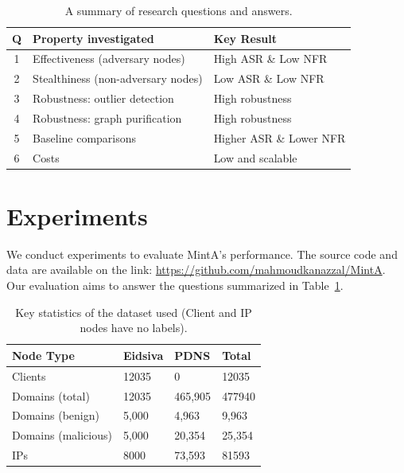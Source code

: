 \documentclass[conference,compsoc]{IEEEtran}
\begin{document}
\begin{table}[htb]
\centering
\caption{A summary of research questions and answers.}
\begin{tabular}{|c|l|l|}
\hline
Q & Property investigated & Key Result \\ \hline
1 & Effectiveness (adversary nodes) & High ASR \& Low NFR \\ \hline
2 & Stealthiness (non-adversary nodes) & Low ASR \& Low NFR \\ \hline
3 & Robustness: outlier detection & High robustness \\ \hline
4 & Robustness: graph purification & High robustness \\ \hline
5 & Baseline comparisons & Higher ASR \& Lower NFR \\ \hline
6 & Costs & Low and scalable \\ \hline
\end{tabular}
\label{summarytable}
\end{table}

\section{Experiments}
\label{Section5}
\par We conduct experiments to evaluate MintA's performance. The source code and data are available on the link:
\href{https://github.com/mahmoudkanazzal/MintA}{https://github.com/mahmoudkanazzal/MintA}. Our evaluation aims to answer the questions summarized in Table~\ref{summarytable}.


\begin{table}[htbp]
 \centering
 \caption{Key statistics of the dataset used (Client and IP nodes have no labels).}
 \begin{tabular}{|l|l|l|l|}
 \hline
Node Type & Eidsiva & PDNS & Total \\ \hline
Clients & 12035 & 0 & 12035 \\\hline
Domains (total) & 12035 & 465,905 & 477940 \\\hline Domains (benign) & 5,000 & 4,963 & 9,963 \\\hline Domains (malicious) & 5,000 & 20,354 & 25,354 \\\hline
IPs & 8000 & 73,593 & 81593\\ \hline
 \end{tabular}
 \label{table2}
\end{table}
\end{document}
